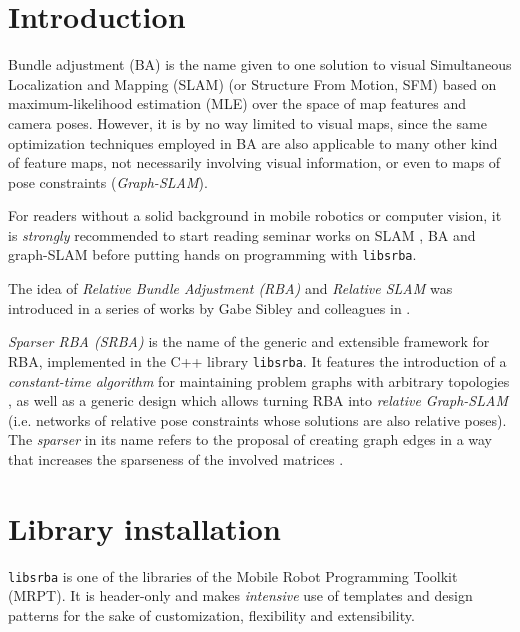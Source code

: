 \documentclass[a4paper,11pt]{article}
\begin{document}
\vspace{1cm}

\newpage
\tableofcontents
\newpage

\section{Introduction}

Bundle adjustment (BA) is the name given to one solution to visual Simultaneous Localization and Mapping (SLAM) (or Structure From Motion, SFM) 
based on maximum-likelihood estimation (MLE) over the space of map features and camera poses. 
However, it is by no way limited to visual maps, since the same 
optimization techniques employed in BA are also applicable to many other 
kind of feature maps, not necessarily involving visual information, or even to maps of pose constraints 
(\emph{Graph-SLAM}).

For readers without a solid background in mobile robotics or computer vision, it is \emph{strongly} recommended 
to start reading seminar works on SLAM \cite{thrun2005pr,durrantwhyte2006sla,bailey2006sla}, 
BA \cite{triggs2000bundle} and graph-SLAM \cite{grisetti2010tgb} before putting hands on
programming with \texttt{libsrba}.

The idea of \emph{Relative Bundle Adjustment (RBA)} and \emph{Relative SLAM} was introduced in a series 
of works by Gabe Sibley and colleagues in \cite{sibley2009rba,sibley2009adaptive,mei2011rslam}. 

\emph{Sparser RBA (SRBA)} is the name of the generic and extensible framework for RBA, implemented in 
the C++ library \texttt{libsrba}. It features the introduction of 
a \emph{constant-time algorithm} for maintaining problem graphs with arbitrary topologies \cite{blanco2013srba}, 
as well as a generic design which allows turning RBA 
into \emph{relative Graph-SLAM} (i.e. networks of relative pose constraints whose solutions are also relative poses).
The \emph{sparser} in its name refers to the proposal of creating graph edges in a way that increases the sparseness 
of the involved matrices \cite{blanco2013srba}.

\newpage
\section{Library installation}

\texttt{libsrba} is one of the libraries of the Mobile Robot Programming Toolkit (MRPT). 
It is header-only and makes \emph{intensive} use of templates and design patterns for the sake of customization, 
flexibility and extensibility. 
\end{document}
